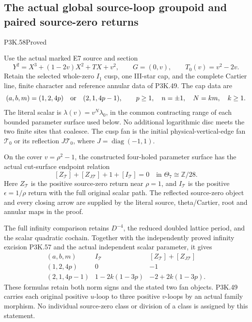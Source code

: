 \subsection{The actual global source-loop groupoid and paired source-zero returns}
\begin{statement}{P3K.58}{Proved}

Use the actual marked E7 source and section
\[
 Y^2=X^3+(1-2v)X^2+TX+v^2,\qquad
 G=(0,v),\qquad T_0(v)=v^2-2v.
\]
Retain the selected whole-zero \(I_1\) cusp, one III-star cap,
and the complete Cartier line, finite character and reference
annular data of P3K.49. The cap data are
\[
 (a,b,m)=(1,2,4p)\quad\hbox{or}\quad(2,1,4p-1),
 \qquad p\ge1,\quad n=\pm1,\quad
 N=km,\quad k\ge1.
\]
The literal scalar is \(\lambda(v)=v^N\lambda_0\), in the
common contracting range of each bounded parameter surface
used below. No additional logarithmic disc meets the two
finite sites that coalesce. The cusp fan is the initial
physical-vertical-edge fan \(\mathcal T_0\) or its reflection
\(J\mathcal T_0\), where \(J=\operatorname{diag}(-1,1)\).

On the cover \(v=\rho^2-1\), the constructed four-holed
parameter surface has the actual cut-surface endpoint relation
\[
 [Z_{\mathcal T}]+[Z_{J\mathcal T}]+1+[I_{\mathcal T}]=0
                    \quad\text{in }\Theta_7\cong\mathbb Z/28.
\]
Here \(Z_{\mathcal T}\) is the positive source-zero return
near \(\rho=1\), and \(I_{\mathcal T}\) is the positive
\(\epsilon=1/\rho\) return with the full original scalar
path. The reflected source-zero object and every closing
arrow are supplied by the literal source, theta/Cartier,
root and annular maps in the proof.

The full infinity comparison retains \(D^{-4}\), the reduced
doubled lattice period, and the scalar quadratic cochain.
Together with the independently proved infinity excision
P3K.57 and the actual independent scalar parameter, it gives
\[
 \begin{array}{c|c|c}
 (a,b,m)&I_{\mathcal T}
                &[Z_{\mathcal T}]+[Z_{J\mathcal T}]\\ \hline
 (1,2,4p)&0&-1\\
 (2,1,4p-1)&1-2k(1-3p)&-2+2k(1-3p).
 \end{array}
\]
These formulas retain both norm signs and the stated two
fan objects. P3K.49 carries each original positive \(u\)-loop
to three positive \(v\)-loops by an actual family morphism.
No individual source-zero class or division of a class is
assigned by this statement.
\end{statement}
